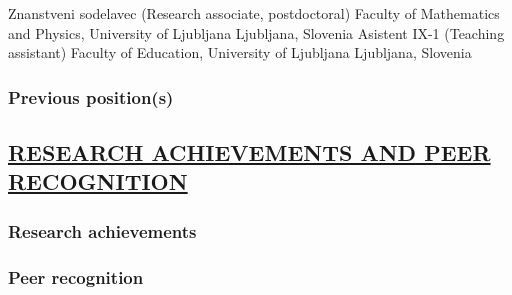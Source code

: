 {Znanstveni sodelavec (Research associate, postdoctoral)}%
%
{%
{Faculty of Mathematics and Physics, University of Ljubljana}%
%
}
{{Ljubljana, Slovenia}}
{}
{}
{Asistent IX-1 (Teaching assistant)}%
%
{%
{Faculty of Education, University of Ljubljana}%
%
}
{{Ljubljana, Slovenia}}
{}
{}

\subsubsection*{Previous position(s)}


\subsection*{\underline{RESEARCH ACHIEVEMENTS AND PEER RECOGNITION}}

\subsubsection*{Research achievements}


\subsubsection*{Peer recognition}


